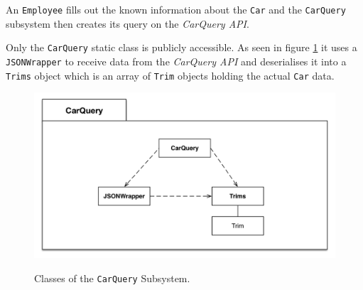 An \texttt{Employee} fills out the known information about the \texttt{Car} and the \texttt{CarQuery} subsystem then creates its query on the \textit{CarQuery API}.

Only the \texttt{CarQuery} static class is publicly accessible. As seen in figure \ref{fig:carquerysubsystem} it uses a \texttt{JSONWrapper} to receive data from the \textit{CarQuery API} and deserialises it into a \texttt{Trims} object which is an array of \texttt{Trim} objects holding the actual \texttt{Car} data.
\begin{figure}[H]
	\centering
	\includegraphics[width=\textwidth]{Figures/CarQuerySubsystemDecomposition}\\
	\caption{Classes of the \texttt{CarQuery} Subsystem.}
	\label{fig:carquerysubsystem}
\end{figure}
